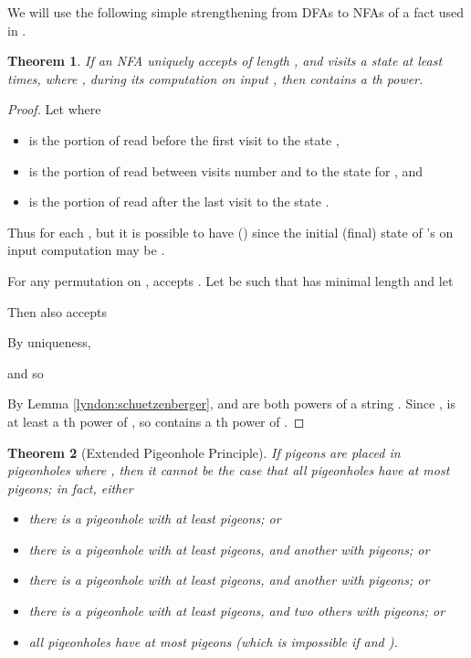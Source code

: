 \documentclass[12pt]{article}
\theoremstyle{plain}
\newtheorem{thm}{Theorem}
\theoremstyle{definition}
\theoremstyle{remark}
\begin{document}
			We will use the following simple strengthening from DFAs to NFAs of a fact used in \cite[Theorem 9]{MR1897300}.
			\begin{thm}\label{nfa9fact}
				If an NFA  uniquely accepts  of length , and visits a state  at least  times, where ,
				during its computation on input ,
				then  contains a th power.
			\end{thm}
			\begin{proof}
				Let  where
				\begin{itemize}
					\item  is the portion of  read before the first visit to the state ,
					\item  is the portion of  read between visits number  and  to the state  for , and
					\item  is the portion of  read after the last visit to the state .
				\end{itemize}
				Thus  for each , but it is possible to have  () since the
				initial (final) state of 's on input  computation may be .

				For any permutation  on ,  accepts .
				Let  be such that  has minimal length and let
				
				Then  also accepts
				
				By uniqueness,
				
				and so
				
				By Lemma \ref{lyndon:schuetzenberger},  and  are both powers of a string .
				Since ,  is at least a th power of , so  contains a th power of .
			\end{proof}
			\begin{thm}[Extended Pigeonhole Principle]\label{php}
				If  pigeons are placed in  pigeonholes where ,
				then it cannot be the case that all pigeonholes have at most  pigeons;
				in fact, either
				\begin{itemize}
					\item{} there is a pigeonhole with at least  pigeons; or
					\item{} there is a pigeonhole with at least  pigeons, and another with  pigeons; or
					\item{} there is a pigeonhole with at least  pigeons, and another with  pigeons; or		
					\item{} there is a pigeonhole with at least  pigeons, and two others with  pigeons; or
					\item{} all pigeonholes have at most  pigeons (which is impossible if  and ).
				\end{itemize}
			\end{thm}
\end{document}
